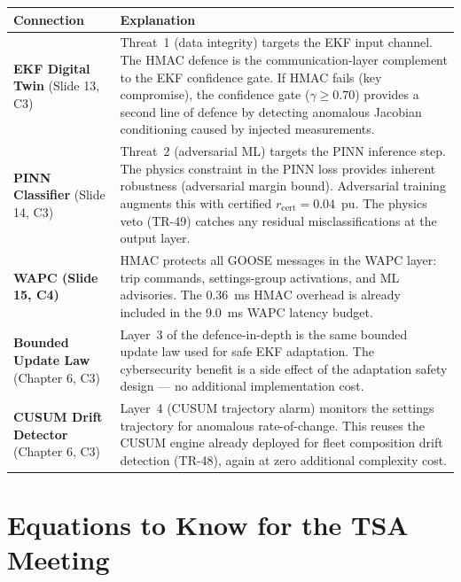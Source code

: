 \documentclass[12pt,a4paper]{article}
\begin{document}
\begin{center}
\begin{tabular}{@{}p{4cm}p{10.5cm}@{}}
\toprule
\textbf{Connection} & \textbf{Explanation} \\
\midrule
\textbf{EKF Digital Twin} \newline (Slide 13, C3) &
Threat~1 (data integrity) targets the EKF input channel. The HMAC defence is the communication-layer complement to the EKF confidence gate. If HMAC fails (key compromise), the confidence gate ($\gamma \geq 0.70$) provides a second line of defence by detecting anomalous Jacobian conditioning caused by injected measurements. \\
\addlinespace
\textbf{PINN Classifier} \newline (Slide 14, C3) &
Threat~2 (adversarial ML) targets the PINN inference step. The physics constraint in the PINN loss provides inherent robustness (adversarial margin bound). Adversarial training augments this with certified $r_\mathrm{cert} = 0.04$~pu. The physics veto (TR-49) catches any residual misclassifications at the output layer. \\
\addlinespace
\textbf{WAPC (Slide 15, C4)} &
HMAC protects all GOOSE messages in the WAPC layer: trip commands, settings-group activations, and ML advisories. The 0.36~ms HMAC overhead is already included in the 9.0~ms WAPC latency budget. \\
\addlinespace
\textbf{Bounded Update Law} \newline (Chapter 6, C3) &
Layer~3 of the defence-in-depth is the same bounded update law used for safe EKF adaptation. The cybersecurity benefit is a side effect of the adaptation safety design --- no additional implementation cost. \\
\addlinespace
\textbf{CUSUM Drift Detector} \newline (Chapter 6, C3) &
Layer~4 (CUSUM trajectory alarm) monitors the settings trajectory for anomalous rate-of-change. This reuses the CUSUM engine already deployed for fleet composition drift detection (TR-48), again at zero additional complexity cost. \\
\bottomrule
\end{tabular}
\end{center}

\section{Equations to Know for the TSA Meeting}
\end{document}
